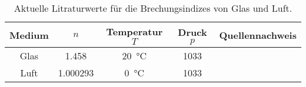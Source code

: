 \begin{table}
  \centering
  \caption{Aktuelle Litraturwerte für die Brechungsindizes von Glas und Luft.}
  \label{tabular_05}
  \begin{tabular}{c c c c c}
    \toprule
   \multicolumn{1}{c}{Medium} & \multicolumn{1}{c}{$n$} & \multicolumn{1}{c}{Temperatur $T$}
   & \multicolumn{1}{c}{Druck $p$} & \multicolumn{1}{c}{Quellennachweis}\\
   \midrule
    Glas & \num{1.458}  & \SI{20}{\celsius} & \num{1033} & \text{\cite{hecht}} \\
    Luft & \num{1.000293} & \SI{0}{\celsius} & \num{1033} & \text{\cite{hecht}} \\
\bottomrule
  \end{tabular}
\end{table}
